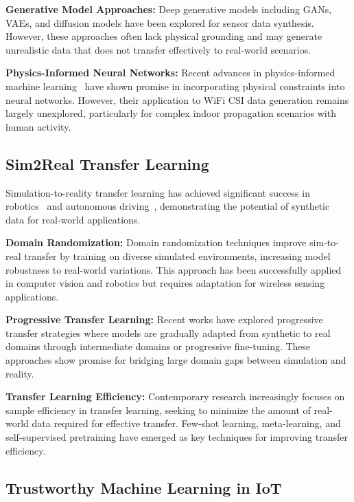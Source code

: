 \documentclass[journal]{IEEEtran}
\begin{document}
\textbf{Generative Model Approaches:} Deep generative models including GANs, VAEs, and diffusion models have been explored for sensor data synthesis. However, these approaches often lack physical grounding and may generate unrealistic data that does not transfer effectively to real-world scenarios.

\textbf{Physics-Informed Neural Networks:} Recent advances in physics-informed machine learning~\cite{pinn_karniadakis2021} have shown promise in incorporating physical constraints into neural networks. However, their application to WiFi CSI data generation remains largely unexplored, particularly for complex indoor propagation scenarios with human activity.

\subsection{Sim2Real Transfer Learning}

Simulation-to-reality transfer learning has achieved significant success in robotics~\cite{sim2real_robotics2017} and autonomous driving~\cite{sim2real_autonomous2019}, demonstrating the potential of synthetic data for real-world applications.

\textbf{Domain Randomization:} Domain randomization techniques improve sim-to-real transfer by training on diverse simulated environments, increasing model robustness to real-world variations. This approach has been successfully applied in computer vision and robotics but requires adaptation for wireless sensing applications.

\textbf{Progressive Transfer Learning:} Recent works have explored progressive transfer strategies where models are gradually adapted from synthetic to real domains through intermediate domains or progressive fine-tuning. These approaches show promise for bridging large domain gaps between simulation and reality.

\textbf{Transfer Learning Efficiency:} Contemporary research increasingly focuses on sample efficiency in transfer learning, seeking to minimize the amount of real-world data required for effective transfer. Few-shot learning, meta-learning, and self-supervised pretraining have emerged as key techniques for improving transfer efficiency.

\subsection{Trustworthy Machine Learning in IoT}
\end{document}
